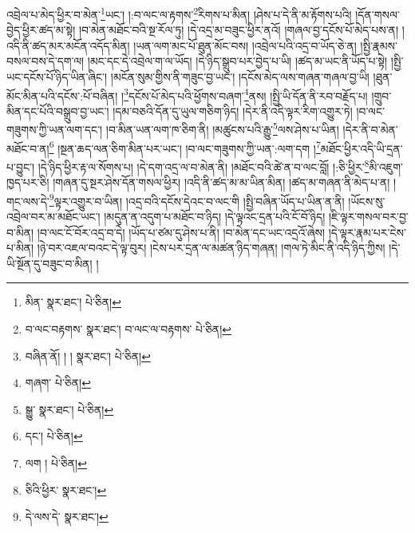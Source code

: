 འབྲེལ་པ་མེད་ཕྱིར་བ་མེན་\footnote{མིན་  སྣར་ཐང་།  པེ་ཅིན། }ཡང་། །:བ་ལང་ལ་རྟགས་\footnote{བ་ལང་བརྟགས་  སྣར་ཐང་། བ་ལང་ལ་བརྟགས་  པེ་ཅིན། }རིགས་པ་མིན། །ཤེས་པ་དེ་ནི་མ་རྟོགས་པའི། །དོན་གསལ་བྱེད་ཕྱིར་ཚད་མ་སྟེ། །བ་མེན་མཐོང་བའི་སྔ་རོལ་ཏུ། །དེ་འདྲ་མ་བཟུང་ཕྱིར་ནའོ། །གཞལ་བྱ་དངོས་པོ་མེད་པས་ན། །འདི་ནི་ཚད་མར་མངོན་འདོད་མིན། །ཡན་ལག་མང་པོ་ཐུན་མོང་བས། །འབྲེལ་པའི་འདྲ་བ་ཡོད་ཅེ་ན། །སྤྱི་རྣམས་བསལ་བས་དེ་དག་ལ། །མང་དང་དེ་འབྲེལ་ག་ལ་ཡོད། །དེ་ཉིད་སྒྲུབ་པར་བྱེད་པ་ཡི། །ཚད་མ་ཡང་ནི་ཡོད་པ་སྟེ། །སྤྱི་ཡང་དངོས་པོ་ཉིད་ཡིན་ཞིང་། །མངོན་སུམ་གྱིས་ནི་གཟུང་བྱ་ཡང་། །དངོས་མེད་ལས་གཞན་གཞལ་བྱ་ཡི། །ཐུན་མོང་མིན་པའི་དངོས་:པོ་བཞིན། །\footnote{བཞིན་ནོ། ། །  སྣར་ཐང་།  པེ་ཅིན། }དངོས་པོ་མེད་པའི་ཕྱོགས་བཞག་\footnote{གཞག་  པེ་ཅིན། }ནས། །སྤྱི་ཡི་དོན་ནི་རབ་བརྗོད་པ། །གྲུབ་མིན་དང་པོའི་བསྒྲུབ་བྱ་ཡང་། །དམ་བཅའི་དོན་དུ་ཡུལ་གཅིག་ཉིད། །དེར་ནི་འདི་ལྟར་རིག་འགྱུར་ཏེ། །བ་ལང་གཟུགས་ཀྱི་ཡན་ལག་དང་། །བ་མིན་ཡན་ལག་ཁ་ཅིག་ནི། །མཚུངས་པའི་རྒྱུ་\footnote{སྒྱུ་  སྣར་ཐང་།  པེ་ཅིན། }ལས་ཤེས་པ་ཡིན། །དེར་ནི་བ་མེན་མཐོང་བ་ན།\footnote{དང་།  པེ་ཅིན། } །སྔན་ཆད་ལན་ཅིག་མིན་པར་ཡང་། །བ་ལང་གཟུགས་ཀྱི་ཡན་:ལག་དག །\footnote{ལག །  པེ་ཅིན། }མཐོང་ཕྱིར་འདི་ཡི་དྲན་པ་བྱུང་། །དེ་ཉིད་ཕྱིར་རྟ་ལ་སོགས་པ། །དེ་དག་འདྲ་ལ་བ་མེན་ནི། །མཐོང་བའི་ཚེ་ན་བ་ལང་བློ། །:ཅི་ཕྱིར་\footnote{ཅིའི་ཕྱིར་  སྣར་ཐང་། }མི་འཇུག་ཁྱད་པར་ཅི། །གཞན་དུ་སྔར་ཤེས་དོན་གསལ་ཕྱིར། །འདི་ནི་ཚད་མ་མ་ཡིན་མིན། །ཚད་མ་གཞན་ནི་མེད་པ་ན། །གང་ལས་དེ་\footnote{དེ་ལས་དེ་  སྣར་ཐང་། }ལྟར་འགྱུར་བ་ཡིན། །འདྲ་བའི་དངོས་དེའང་བ་ལང་གི །སྤྱི་བཞིན་ཡོད་པ་ཡིན་ན་ནི། །ཡོངས་སུ་འབྲེལ་བར་མ་མཐོང་ཡང་། །མདུན་ན་འདུག་པ་མཐོང་བ་ཉིད། །དེ་ལྟའང་དྲན་པའི་ངོ་བོ་ཉིད། །ཇི་ལྟར་གསལ་བར་བྱ་བ་མིན། །བ་ལང་ངོ་བོར་འདྲ་བ་དེ། །ཡོད་པ་ཙམ་དུ་ཤེས་པ་ནི། །བ་མེན་དང་ཡང་འདྲའོ་ཞེས། །དེ་ལྟར་རྣམ་པར་ངེས་པ་མིན། །ཉེ་བར་འཇལ་བའང་དེ་ལྟ་བུར། །ངེས་པར་དྲན་ལ་མཚན་ཉིད་གཞན། །གལ་ཏེ་མིང་ནི་འདི་ཉིད་ཀྱིས། །དེ་ཡི་སྔོན་དུ་བཟུང་བ་མིན། །

